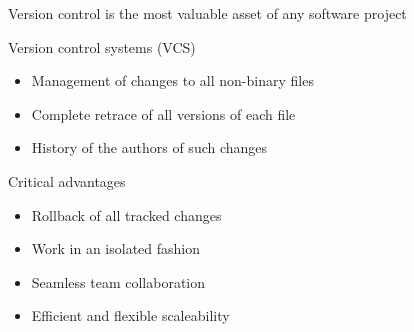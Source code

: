 \documentclass{beamer}
\begin{document}
\begin{frame}{Version control}
	 is the most valuable asset of any software project
	\begin{block}{Version control systems (VCS)}
		\begin{itemize}
			\item Management of changes to all non-binary files
			\item Complete retrace of all versions of each file
			\item History of the authors of such changes
		\end{itemize}
	\end{block} 
	
	\begin{exampleblock}{Critical advantages}
		\begin{itemize}
			\item Rollback of all tracked changes
			\item Work in an isolated fashion
			\item Seamless team collaboration
			\item Efficient and flexible scaleability
		\end{itemize}
	\end{exampleblock}
\end{frame}
\end{document}
